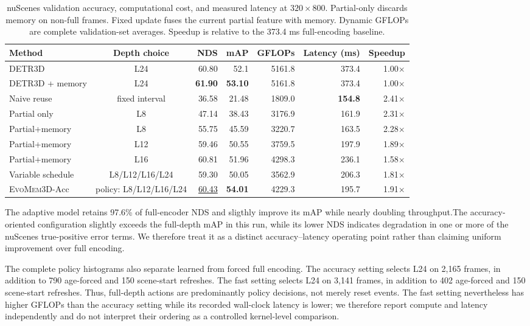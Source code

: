 \documentclass[10pt,twocolumn,letterpaper]{article}
\newcommand{\method}{\textsc{EvoMem3D}}
\begin{document}
\begin{table}[t]
\centering
\small
\caption{nuScenes validation accuracy, computational cost, and measured latency at $320\times800$. Partial-only discards memory on non-full frames. Fixed update fuses the current partial feature with memory. Dynamic GFLOPs are complete validation-set averages. Speedup is relative to the 373.4 ms full-encoding baseline.}
\label{tab:policy_ablation}
\begin{tabular}{lcrrrrr}
\toprule
Method & Depth choice  & NDS & mAP & GFLOPs & Latency (ms) & Speedup \\
\midrule
DETR3D & L24 &  60.80 & 52.1 & 5161.8 & 373.4 & 1.00$\times$ \\
DETR3D + memory & L24 &  \textbf{61.90} & \textbf{53.10} & 5161.8 & 373.4 & 1.00$\times$ \\
Naive reuse & fixed interval & 36.58 & 21.48 & 1809.0 & \textbf{154.8} & 2.41$\times$ \\
\midrule
Partial only & L8 &  47.14 & 38.43 & 3176.9 & 161.9 & 2.31$\times$ \\
Partial+memory & L8  & 55.75 & 45.59 & 3220.7 & 163.5 & 2.28$\times$ \\
Partial+memory & L12  & 59.46 & 50.55 & 3759.5 & 197.9 & 1.89$\times$ \\
Partial+memory & L16  & 60.81 & 51.96 & 4298.3 & 236.1 & 1.58$\times$ \\
Variable schedule & L8/L12/L16/L24  & 59.30 & 50.05 & 3562.9 & 206.3 & 1.81$\times$ \\
\midrule
\method{}-$\mathrm{Acc}$ & policy: L8/L12/L16/L24  & \underline{60.43} & \textbf{54.01} & 4229.3 & 195.7 & 1.91$\times$ \\
\bottomrule
\end{tabular}
\end{table}


The adaptive model retains 97.6\% of full-encoder NDS and sligthly improve its mAP while nearly doubling throughput.The accuracy-oriented configuration slightly exceeds the full-depth
mAP in this run, while its lower NDS indicates degradation in one or
more of the nuScenes true-positive error terms. We therefore treat it
as a distinct accuracy--latency operating point rather than claiming
uniform improvement over full encoding.

The complete policy histograms also separate learned from forced full
encoding. The accuracy setting selects L24 on 2,165 frames, in addition
to 790 age-forced and 150 scene-start refreshes. The fast setting selects
L24 on 3,141 frames, in addition to 402 age-forced and 150 scene-start
refreshes. Thus, full-depth actions are predominantly policy decisions,
not merely reset events. The fast setting nevertheless has higher
GFLOPs than the accuracy setting while its recorded wall-clock latency is
lower; we therefore report compute and latency independently and do not
interpret their ordering as a controlled kernel-level comparison.
\end{document}

